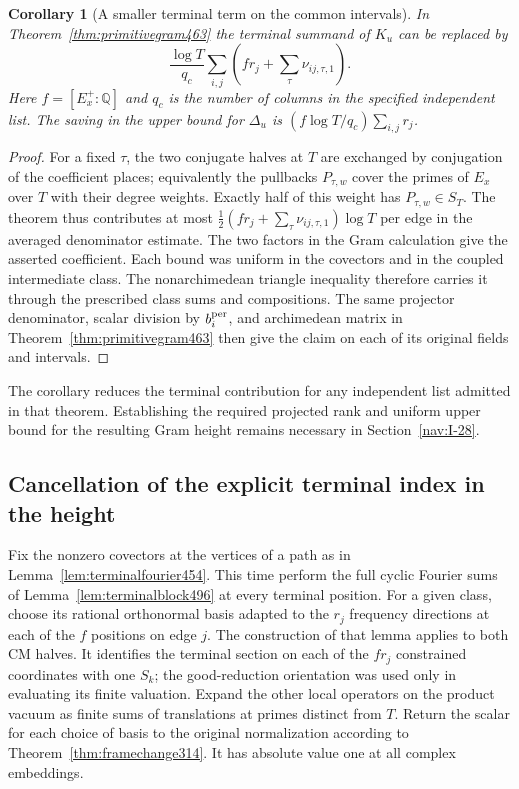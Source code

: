 \documentclass[a4paper,11pt]{article}
\newtheorem{corollary}[proposition]{Corollary}
\theoremstyle{definition}
\theoremstyle{remark}
\numberwithin{equation}{section}
\begin{document}
\begin{corollary}[A smaller terminal term on the common intervals]\leavevmode
\label{cor:centeredterm496}
In Theorem~\ref{thm:primitivegram463} the terminal summand of
\(K_u\) can be replaced by
\[
        \frac{\log T}{q_c}\sum_{i,j}
                   \left(fr_j+\sum_\tau\nu_{ij,\tau,1}\right).
\]
Here \(f=[E_x^+:\mathbb Q]\) and \(q_c\) is the number of columns
in the specified independent list. The saving in the upper
bound for \(\Delta_u\) is
\((f\log T/q_c)\sum_{i,j}r_j\).
\end{corollary}
\begin{proof}
For a fixed \(\tau\), the two conjugate halves at \(T\) are
exchanged by conjugation of the coefficient places; equivalently
the pullbacks \(P_{\tau,w}\) cover the primes of \(E_x\) over
\(T\) with their degree weights. Exactly half of this weight
has \(P_{\tau,w}\in S_T\). The theorem thus contributes at
most \(\tfrac12(fr_j+\sum_\tau\nu_{ij,\tau,1})\log T\)
per edge in the averaged denominator estimate. The two factors
in the Gram calculation give the asserted coefficient. Each
bound was uniform in the covectors and in the coupled
intermediate class. The nonarchimedean triangle inequality
therefore carries it through the prescribed class sums and
compositions. The same projector denominator, scalar division
by \(b_i^{\rm per}\), and archimedean matrix in
Theorem~\ref{thm:primitivegram463} then give the claim on each
of its original fields and intervals.
\end{proof}
The corollary reduces the terminal contribution for any
independent list admitted in that theorem. Establishing the
required projected rank and uniform upper bound for the
resulting Gram height remains necessary in Section~\ref{nav:I-28}.


\subsection{Cancellation of the explicit terminal index in the height}
\label{sec:terminalheight497}

Fix the nonzero covectors at the vertices of a path as in
Lemma~\ref{lem:terminalfourier454}. This time perform the full
cyclic Fourier sums of Lemma~\ref{lem:terminalblock496} at
every terminal position. For a given class, choose its rational
orthonormal basis adapted to the \(r_j\) frequency directions
at each of the \(f\) positions on edge \(j\). The construction
of that lemma applies to both CM halves. It identifies the
terminal section on each of the \(fr_j\) constrained coordinates
with one \(S_k\); the good-reduction orientation was used only
in evaluating its finite valuation. Expand the other local
operators on the product vacuum as finite sums of translations
at primes distinct from \(T\). Return the scalar for each
choice of basis to the original normalization according to
Theorem~\ref{thm:framechange314}. It has absolute value one
at all complex embeddings.
\end{document}
